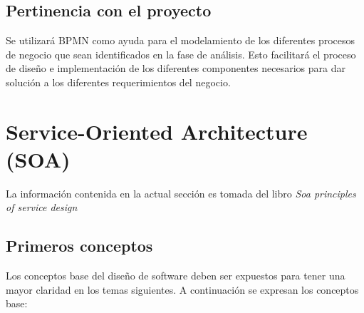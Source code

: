 \subsection{Pertinencia con el proyecto}

Se utilizará BPMN como ayuda para el modelamiento de los diferentes procesos de negocio que sean identificados en la fase de análisis. Esto facilitará el proceso de diseño e implementación de los diferentes componentes necesarios para dar solución a los diferentes requerimientos del negocio.

\section{Service-Oriented Architecture (SOA)}

La información contenida en la actual sección es tomada del libro \textit{Soa principles of service design} \cite{soa_principles}

\subsection{Primeros conceptos}

Los conceptos base del diseño de software deben ser expuestos para tener una mayor claridad en los temas siguientes. A continuación se expresan los conceptos base:

